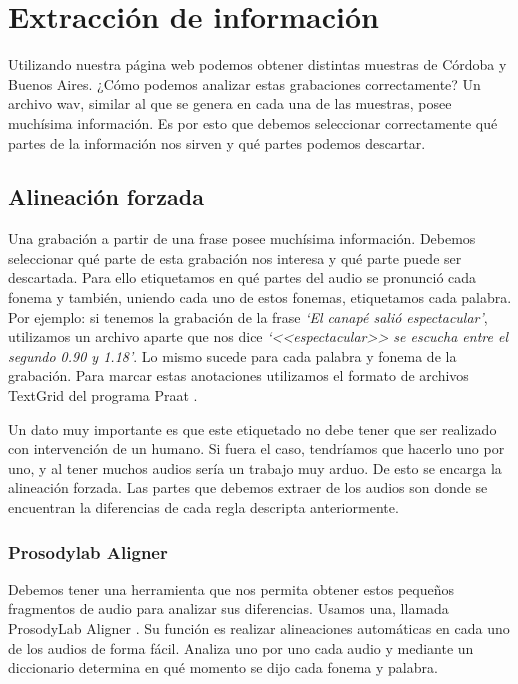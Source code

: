 \chapter{Extracción de información}

Utilizando nuestra página web podemos obtener distintas muestras de Córdoba y Buenos Aires. ¿Cómo podemos analizar estas grabaciones correctamente? Un archivo wav, similar al que se genera en cada una de las muestras, posee muchísima información. Es por esto que debemos seleccionar correctamente qué partes de la información nos sirven y qué partes podemos descartar.

\section{Alineación forzada}

Una grabación a partir de una frase posee muchísima información. Debemos seleccionar qué parte de esta grabación nos interesa y qué parte puede ser descartada. Para ello etiquetamos en qué partes del audio se pronunció cada fonema y también, uniendo cada uno de estos fonemas, etiquetamos cada palabra. Por ejemplo: si tenemos la grabación de la frase \textit{`El canapé salió espectacular’}, utilizamos un archivo aparte que nos dice \textit{`<<espectacular>> se escucha entre el segundo 0.90 y 1.18’}. Lo mismo sucede para cada palabra y fonema de la grabación. Para marcar estas anotaciones utilizamos el formato de archivos TextGrid del programa Praat  \cite{praat}.

Un dato muy importante es que este etiquetado no debe tener que ser realizado con intervención de un humano. Si fuera el caso, tendríamos que hacerlo uno por uno, y al tener muchos audios sería un trabajo muy arduo. De esto se encarga la alineación forzada. Las partes que debemos extraer de los audios son donde se encuentran la diferencias de cada regla descripta anteriormente. 

\subsection{Prosodylab Aligner}


Debemos tener una herramienta que nos permita obtener estos pequeños fragmentos de audio para analizar sus diferencias. Usamos una, llamada ProsodyLab Aligner \cite{prosodylab}. Su función es realizar alineaciones automáticas en cada uno de los audios de forma fácil. Analiza uno por uno cada audio y mediante un diccionario determina en qué momento se dijo cada fonema y palabra. 

